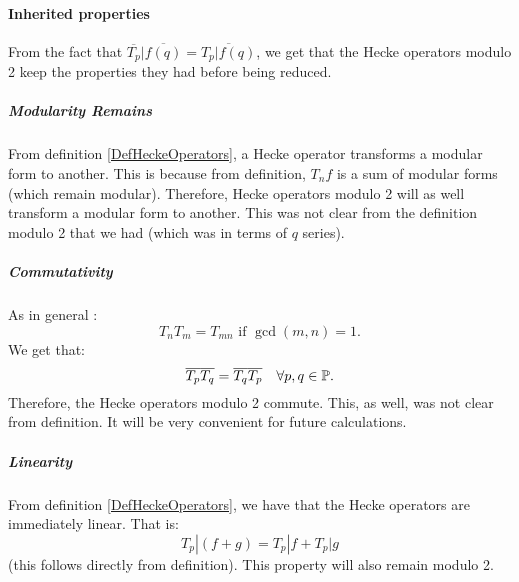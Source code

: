 \paragraph{Inherited properties}
From the fact that $\overline{T_p}|\overline{f(q)} = \overline{T_p|f(q)}$, we get that the Hecke operators modulo 2 keep the properties they had before being reduced.
\subparagraph{Modularity Remains}
\label{HekeModular}
From definition \ref{DefHeckeOperators}, a Hecke operator transforms a modular form to another.
This is because from definition, $T_nf$ is a sum of modular forms (which remain modular).
Therefore, Hecke operators modulo 2 will as well transform a modular form to another.
This was not clear from the definition modulo 2 that we had (which was in terms of $q$ series).
\subparagraph{Commutativity}
\label{HekeCommute}
As in general \cite[p.101]{CourseInArithmetic}:
$$
T_nT_m = T_{mn} \text{ if } \gcd(m,n)=1.
$$
We get that:
$$
\overline{T_p}\overline{T_q} = \overline{T_q}\overline{T_p} \quad \forall p,q \in \mathbb{P}.
$$
Therefore, the Hecke operators modulo 2 commute.
This, as well, was not clear from definition.
It will be very convenient for future calculations.
\subparagraph{Linearity}
\label{HekeLinear}
From definition \ref{DefHeckeOperators}, we have that the Hecke operators are immediately linear.
That is:
$$
T_p|(f+g) = T_p|f + T_p|g
$$
(this follows directly from definition).
This property will also remain modulo 2.

